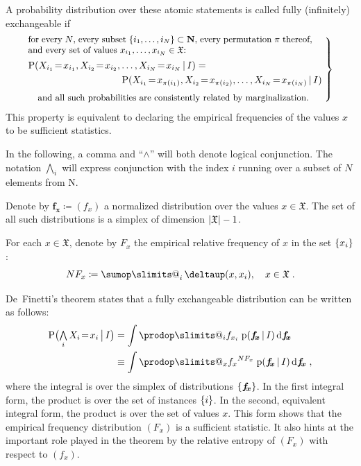 \documentclass[\ifafour a4paper,12pt,\else a5paper,10pt,\fi%
onecolumn,oneside,article,%
british%
]{memoir}
\makeatletter
\theoremstyle{remark}
\theoremstyle{innote}
\def\sum{\DOTSI\sumop\slimits@}
\def\prod{\DOTSI\prodop\slimits@}
\newcommand*{\delt}{\deltaup}%
\newcommand*{\di}{\mathrm{d}}%
\newcommand*{\NN}{\bm{\mathrm{N}}}
\newcommand*{\defd}{\coloneqq}
\newcommand*{\Land}{\mathop{\textstyle\bigwedge}}
\DeclarePairedDelimiter\abs{\lvert}{\rvert}
\DeclarePairedDelimiter\set{\{}{\}}
\newcommand*{\pf}{\mathrm{p}}%
\newcommand*{\p}{\mathrm{P}}%
\renewcommand*{\|}[1][]{\nonscript\,#1\vert\nonscript\,\mathopen{}}
\newcommand*{\tsum}{\mathop{\textstyle\sum}\nolimits}
\renewcommand*{\=}{\TextOrMath\texteq\eq}
\newcommand*{\X}[1]{X_{#1}}
\newcommand*{\x}[1]{x_{#1}}
\newcommand*{\sx}{\mathfrak{X}}
\newcommand*{\fx}{\bm{f_{\!x}}}
\makeatother
\begin{document}
A probability distribution over these atomic statements
is called fully (infinitely) exchangeable if
\begin{equation}
  \label{eq:exchangeable}\left.
\begin{multlined}
  \parbox{0.85\linewidth}{\small for every $N$, every subset
    $\set{i_{1},\dotsc,i_{N}}\subset \NN$, every permutation $\pi$ thereof,
    and every set of values $\x{i_{1}},\dotsc,\x{i_{N}} \in \sx$:}
  \\[\jot]
  \shoveleft{\p( \X{i_{1}}\=\x{i_{1}}, \X{i_{2}}\=\x{i_{2}},\dotsc,\X{i_{N}}\=\x{i_{N}}
    \| I) ={}}\\
  \shoveright{\p( \X{i_{1}}\=\x{\pi(i_{1})},
    \X{i_{2}}\=\x{\pi(i_{2})},\dotsc,\X{i_{N}}\=\x{\pi(i_{N})}   \| I)}
  \\[\jot]
  \shoveleft{\text{\small and all such probabilities are consistently related by marginalization.}}
\end{multlined}\;\right\}
\end{equation}
This property is equivalent to declaring the empirical frequencies of the
values $x$ to be sufficient statistics.

In the following, a comma and \enquote{$\land$} will both denote logical
conjunction. The notation $\Land_{i}$ will express conjunction with the
index $i$ running over a subset of $N$ elements from $\NN$.

Denote by $\fx \defd (f_{x})$ a normalized distribution over the values
$x \in \sx$. The set of all such distributions is a simplex of dimension
$\abs{\sx}-1$.

For each $x \in \sx$, denote by $F_{x}$ the empirical relative frequency of
$x$ in the set $\set{x_{i}}$:
\begin{equation}
  \label{eq:rel_frequencies}
  N F_{x} \defd \tsum_{i}\delt(x, \x{i}), \quad x \in \sx \;.
\end{equation}

De~Finetti's theorem states that a fully exchangeable distribution can be
written as follows:
\begin{equation}
  \label{eq:definetti_freq}
  \begin{split}
  \p\bigl( \Land_{i} \X{i}\=\x{i} \|[\big] I\bigr) &=
  \int \prod_{i} f_{\x{i}}\;  \pf(\fx \| I)\,\di\fx
\\&\equiv  \int\prod_{x} {f_{x}}^{N F_{x}}\;   \pf(\fx \| I)\,\di\fx \;,
\end{split}
\end{equation}
where the integral is over the simplex of distributions $\set{\fx}$. In the
first integral form, the product is over the set of instances $\set{i}$.
In the second, equivalent integral form, the product is over the set of
values $x$. This form shows that the empirical frequency distribution
$(F_{x})$ is a sufficient statistic. It also hints at the important role
played in the theorem by the relative entropy of $(F_{x})$ with respect to
$(f_{x})$.
\end{document}
